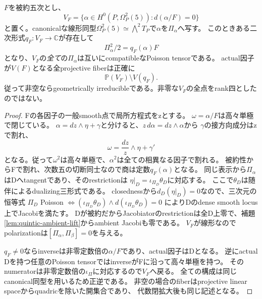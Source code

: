 \begin{theorem}[被約固定因子の全fiberは線形空間の開集合]\label{thm:reduced-fibre-linear}
$F$を被約五次とし、
\[
 V_F=\{\alpha\in H^0(P,\Omega_P^2(5)):d(\alpha/F)=0\}
\]
と置く。canonicalな線形同型$\Omega_P^2(5)\simeq\bigwedge^2T_P$で$\alpha$を$\Pi_\alpha$へ写す。
このときある二次形式$q_F:V_F\to\mathbb C$が存在して
\[
 \Pi_\alpha^2/2=q_F(\alpha)F
\]
となり、$V_F$の\emph{全て}の$\Pi_\alpha$は互いにcompatibleなPoisson tensorである。
actual因子が$V(F)$となる全projective fiberは正確に
\begin{equation}
 \mathbb P(V_F)\setminus V(q_F).\label{eq:reduced-linear-fibre}
\end{equation}
従って非空ならgeometrically irreducibleである。非零な$V_F$の全点をrank四としたのではない。
\end{theorem}
\begin{proof}
Fの各因子の一般smooth点で局所方程式をzとする。
$\omega=\alpha/F$は高々単極で閉じている。
$\alpha=dz\wedge\eta+\gamma$と分けると、$z\,d\alpha=dz\wedge\alpha$から
$\gamma$の接方向成分はzで割れ、
\[
 \omega=\frac{dz}{z}\wedge\eta+\gamma'
\]
となる。従って$\omega^2$は高々単極で、$\alpha^2$は全ての相異なる因子で割れる。
被約性からFで割れ、次数五の切断同士なので商は定数$q_F(\alpha)$となる。
同じ表示から$\Pi_\alpha$はDへtangentであり、そのrestrictionは
$\eta|_D=\iota_{\Pi_D}\theta_D$に対応する。
ここで$\theta_D$は随伴によるdualizing三形式である。
closednessから$d_D(\eta|_D)=0$なので、三次元の恒等式
$\Pi_D$ Poisson $\Longleftrightarrow(\iota_{\Pi_D}\theta_D)\wedge d(\iota_{\Pi_D}\theta_D)=0$
によりDのdense smooth locus上でJacobiを満たす。
Dが被約だからJacobiatorのrestrictionは全D上零で、補題\ref{lem:quintic-ambient-lift}からambient Jacobiも零である。
$V_F$が線形なのでpolarizationは$[\Pi_\alpha,\Pi_\beta]=0$を与える。

$q_F\ne0$ならinverseは非零定数倍の$\alpha/F$であり、actual因子はDとなる。
逆にactual Dを持つ任意のPoisson tensorではinverseがFに沿って高々単極を持つ。
そのnumeratorは非零定数倍の$\iota_\Pi$に対応するので$V_F$へ戻る。
全ての構成は同じcanonical同型を用いるため正逆である。
非空の場合のfiberはprojective linear spaceからquadricを除いた開集合であり、
代数閉拡大後も同じ記述となる。
\end{proof}

